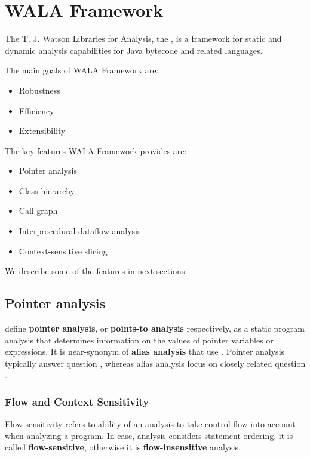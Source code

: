 \section{WALA Framework \label{chapter:analysis:wala}}

The T. J. Watson Libraries for Analysis, the \citet{WalaFramework},
is a framework for static and dynamic analysis capabilities for Java
bytecode and related languages.

The main goals of WALA Framework are:
\begin{itemize}
  \item Robustness
  \item Efficiency
  \item Extensibility
\end{itemize}

The key features WALA Framework provides are:
\begin{itemize}
  \item Pointer analysis
  \item Class hierarchy
  \item Call graph
  \item Interprocedural dataflow analysis
  \item Context-sensitive slicing
\end{itemize}

We describe some of the features in next sections.



\subsection{Pointer analysis}

\citet{PointerAnalysis} define \textbf{pointer analysis},
or \textbf{points-to analysis} respectively, as a static program analysis that
determines information on the values of pointer variables or expressions.
It is near-synonym of \textbf{alias analysis} that use \citet{AliasAnalysis}.
Pointer analysis typically answer question
,
whereas alias analysis focus on closely related question
.




\subsubsection{Flow and Context Sensitivity}

Flow sensitivity refers to ability of an analysis to take control flow
into account when analyzing a program.
In case, analysis considers statement ordering, it is called \textbf{flow-sensitive},
otherwise it is \textbf{flow-insensitive} analysis.

